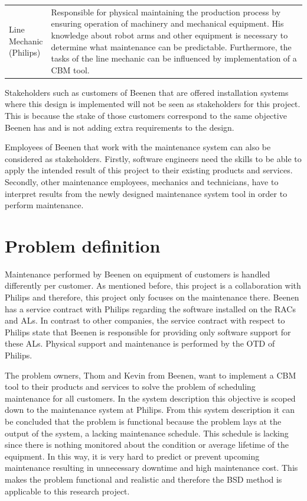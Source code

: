 \begin{center}
\begin{longtable}[width=\textwidth]{ p{} | p{}}
\parbox[t]{0.15\textwidth}{Line\\Mechanic\\(Philips)} & Responsible for physical maintaining the production process by ensuring operation of machinery and mechanical equipment. His knowledge about robot arms and other equipment is necessary to determine what maintenance can be predictable. Furthermore, the tasks of the line mechanic can be influenced by implementation of a CBM tool.   \\
\end{longtable}
\end{center}

Stakeholders such as customers of Beenen that are offered installation systems where this design is implemented will not be seen as stakeholders for this project. This is because the stake of those customers correspond to the same objective Beenen has and is not adding extra requirements to the design.

Employees of Beenen that work with the maintenance system can also be considered as stakeholders. Firstly, software engineers need the skills to be able to apply the intended result of this project to their existing products and services. Secondly, other maintenance employees, mechanics and technicians, have to interpret results from the newly designed maintenance system tool in order to perform maintenance. 

\section{Problem definition} \label{Problem definition}
Maintenance performed by Beenen on equipment of customers is handled differently per customer. As mentioned before, this project is a collaboration with Philips and therefore, this project only focuses on the maintenance there. Beenen has a service contract with Philips regarding the software installed on the RACs and ALs. In contrast to other companies, the service contract with respect to Philips state that Beenen is responsible for providing only software support for these ALs. Physical support and maintenance is performed by the OTD of Philips.  

The problem owners, Thom and Kevin from Beenen, want to implement a CBM tool to their products and services to solve the problem of scheduling maintenance for all customers. In the system description this objective is scoped down to the maintenance system at Philips. From this system description it can be concluded that the problem is functional because the problem lays at the output of the system, a lacking maintenance schedule. This schedule is lacking since there is nothing monitored about the condition or average lifetime of the equipment. In this way, it is very hard to predict or prevent upcoming maintenance resulting in unnecessary downtime and high maintenance cost. This makes the problem functional and realistic and therefore the BSD method is applicable to this research project.

